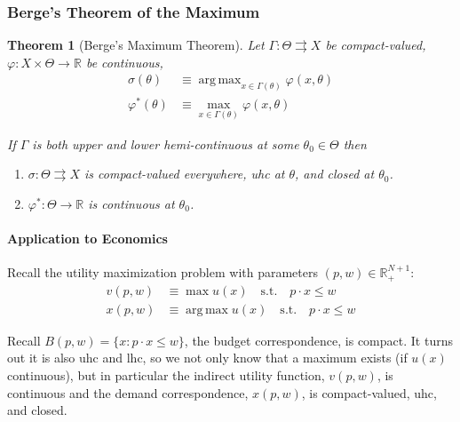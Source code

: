\documentclass{article}
\newcommand{\toto}{\rightrightarrows}
\DeclareMathOperator*{\argmax}{arg\,max}
\theoremstyle{mythm}
\newtheorem{theorem}{Theorem}
\theoremstyle{mydef}
\begin{document}
\subsubsection{Berge's Theorem of the Maximum}
\label{ssub:berge_s_theorem_of_the_maximum}
\begin{theorem}[Berge's Maximum Theorem]\label{thm:lecture4_correspondences_maximum_theorem}
  Let $\Gamma: \Theta \toto X$ be compact-valued, $\varphi: X \times \Theta \to \mathbb{R}$ be continuous,
  \begin{align*}
    \sigma(\theta)
    &
    \equiv
    \argmax_{x \in \Gamma(\theta)}
    \varphi(x, \theta)
    \\
    \varphi^*(\theta)
    &
    \equiv
    \max_{x \in \Gamma(\theta)}
    \varphi(x, \theta)
  \end{align*}

  If $\Gamma$ is \textit{both} upper and lower hemi-continuous at some $\theta_0 \in \Theta$ then
  \begin{enumerate}
    \item $\sigma: \Theta \toto X$ is compact-valued everywhere, uhc at $\theta$, and closed at $\theta_0$.

    \item $\varphi^*: \Theta \to \mathbb{R}$ is continuous at $\theta_0$.
  \end{enumerate}
\end{theorem}

\paragraph{Application to Economics}
\label{par:application_to_economics_correspondences}

Recall the utility maximization problem with parameters $(p, w) \in \mathbb{R}^{N + 1}_{+}$:
\begin{align*}
  v(p, w)
  &
  \equiv
  \max u(x)
  \quad
  \text{s.t.}
  \quad
  p \cdot x \le w
  \\
  x(p, w)
  &
  \equiv
  \argmax u(x)
  \quad
  \text{s.t.}
  \quad
  p \cdot x \le w
\end{align*}

Recall $B(p, w) = \{x: p \cdot x \le w\}$, the budget correspondence, is compact. It turns out it is also uhc and lhc, so we not only know that a maximum exists (if $u(x)$ continuous), but in particular the indirect utility function, $v(p, w)$, is continuous and the demand correspondence, $x(p, w)$, is compact-valued, uhc, and closed.
\end{document}
